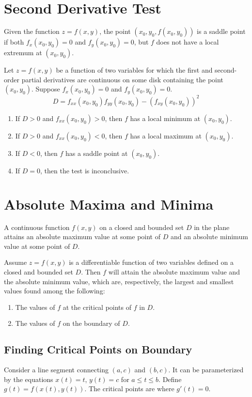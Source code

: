 \documentclass{article}
\begin{document}
\section*{Second Derivative Test}
Given the function $z=f(x,y)$, the point $(x_0,y_0,f(x_0,y_0))$ is a saddle point if both $f_x(x_0,y_0)=0$ and $f_y(x_0,y_0)=0$, but $f$ does not have a local extremum at $(x_0,y_0)$.

Let $z=f(x,y)$ be a function of two variables for which the first and second-order partial derivatives are continuous on some disk containing the point $(x_0,y_0)$. Suppose $f_x(x_0,y_0)=0$ and $f_y(x_0,y_0)=0$.
\[D=f_{xx}(x_0,y_0)f_{yy}(x_0,y_0)-{(f_{xy}(x_0,y_0))}^2\]
\begin{enumerate}
    \item If $D>0$ and $f_{xx}(x_0,y_0)>0$, then $f$ has a local minimum at $(x_0,y_0)$.
    \item If $D>0$ and $f_{xx}(x_0,y_0)<0$, then $f$ has a local maximum at $(x_0,y_0)$.
    \item If $D<0$, then $f$ has a saddle point at $(x_0,y_0)$.
    \item If $D=0$, then the test is inconclusive.
\end{enumerate}

\section*{Absolute Maxima and Minima}

A continuous function $f(x,y)$ on a closed and bounded set $D$ in the plane attains an absolute maximum value at some point of $D$ and an absolute minimum value at some point of $D$.
\vspace{1em}

Assume $z=f(x,y)$ is a differentiable function of two variables defined on a closed and bounded set $D$. Then $f$ will attain the absolute maximum value and the absolute minimum value, which are, respectively, the largest and smallest values found among the following:
\begin{enumerate}
    \item The values of $f$ at the critical points of $f$ in $D$.
    \item The values of $f$ on the boundary of $D$.
\end{enumerate}

\subsection*{Finding Critical Points on Boundary}
Consider a line segment connecting $(a,c)$ and $(b,c)$. It can be parameterized by the equations $x(t)=t$, $y(t)=c$ for $a\leq t\leq b$. Define $g(t)=f(x(t),y(t))$. The critical points are where $g'(t)=0$.
\end{document}
